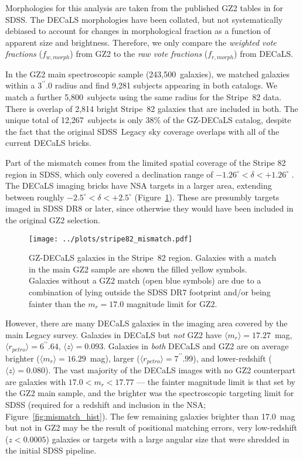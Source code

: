 \documentclass[iop,apj,tighten]{emulateapj}
\begin{document}
Morphologies for this analysis are taken from the published GZ2 tables in \citet{wil13} for SDSS. The DECaLS morphologies have been collated, but not systematically debiased to account for changes in morphological fraction as a function of apparent size and brightness. Therefore, we only compare the \emph{weighted vote fractions} ($f_{w,morph}$) from GZ2 to the \emph{raw vote fractions} ($f_{r,morph}$) from DECaLS.

In the GZ2 main spectroscopic sample (243,500~galaxies), we matched galaxies within a $3^{\prime\prime}.0$ radius and find 9,281 subjects appearing in both catalogs. We match a further 5,800~subjects using the same radius for the Stripe~82 data. There is overlap of 2,814 bright Stripe~82 galaxies that are included in both. The unique total of 12,267~subjects is only 38\% of the GZ-DECaLS catalog, despite the fact that the original SDSS~Legacy sky coverage \citep{str02} overlaps with all of the current DECaLS bricks. 

Part of the mismatch comes from the limited spatial coverage of the Stripe 82 region in SDSS, which only covered a declination range of $-1.26^\circ<\delta<+1.26^\circ$ \citep{ann14}. The DECaLS imaging bricks have NSA targets in a larger area, extending between roughly $-2.5^\circ<\delta<+2.5^\circ$ (Figure~\ref{fig:mismatch_map}). These are presumbly targets imaged in SDSS DR8 or later, since otherwise they would have been included in the original GZ2 selection. 

\begin{figure}
\centering
\texttt{[image: ../plots/stripe82\_mismatch.pdf]}
\caption{GZ-DECaLS galaxies in the Stripe~82 region. Galaxies with a match in the main GZ2 sample are shown the filled yellow symbols. Galaxies without a GZ2 match (open blue symbols) are due to a combination of lying outside the SDSS DR7 footprint and/or being fainter than the $m_r=17.0$ magnitude limit for GZ2.\label{fig:mismatch_map}}
\end{figure}

However, there are many DECaLS galaxies in the imaging area covered by the main Legacy survey. Galaxies in DECaLS but \emph{not} GZ2 have $\langle m_r\rangle = 17.27$~mag, $\langle r_{petro}\rangle = 6^{\prime\prime}.64$, $\langle z\rangle = 0.093$. Galaxies in \emph{both} DECaLS and GZ2 are on average brighter ($\langle m_r\rangle = 16.29$~mag), larger ($\langle r_{petro}\rangle = 7^{\prime\prime}.99$), and lower-redshift ($\langle z\rangle = 0.080$). The vast majority of the DECaLS images with no GZ2 counterpart are galaxies with $17.0 < m_r < 17.77$ --- the fainter magnitude limit is that set by the GZ2 main sample, and the brighter was the spectroscopic targeting limit for SDSS (required for a redshift and inclusion in the NSA; Figure~\ref{fig:mismatch_hist}). The few remaining galaxies brighter than 17.0~mag but not in GZ2 may be the result of positional matching errors, very low-redshift ($z<0.0005$) galaxies or targets with a large angular size that were shredded in the initial SDSS pipeline. 
\end{document}
